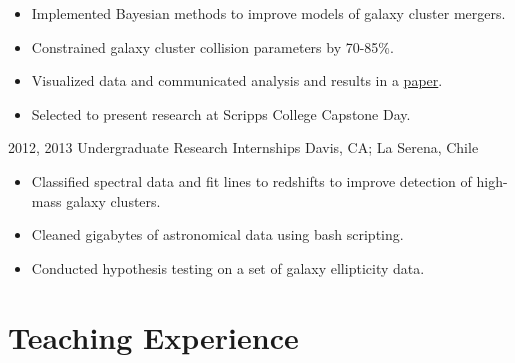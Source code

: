 \documentclass[]{cv-style}          %
\begin{document}
\begin{entrylist}
{\begin{itemize}
    \item Implemented Bayesian methods to improve models of galaxy cluster mergers. 
    \item Constrained galaxy cluster collision parameters by 70-85\%.
    \item Visualized data and communicated analysis and results in a \href{https://github.com/eqfinney/thesis-2013/blob/master/EQF_thesis.pdf}{paper}.
    \item Selected to present research at Scripps College Capstone Day.\\
  \end{itemize}}
\entry
  {2012, 2013}
  {Undergraduate Research Internships}
  {Davis, CA; La Serena, Chile}
  {
  \begin{itemize}
    \item Classified spectral data and fit lines to redshifts to improve detection of high-mass galaxy clusters.
    \item Cleaned gigabytes of astronomical data using bash scripting.
    \item Conducted hypothesis testing on a set of galaxy ellipticity data.\\
  \end{itemize}}


\end{entrylist}



\section{Teaching Experience}
\end{document}
